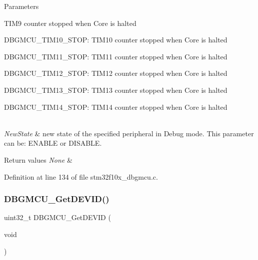 \begin{DoxyParams}{Parameters}
\begin{DoxyItemize}
T\+I\+M9 counter stopped when Core is halted \item D\+B\+G\+M\+C\+U\+\_\+\+T\+I\+M10\+\_\+\+S\+T\+OP\+: T\+I\+M10 counter stopped when Core is halted \item D\+B\+G\+M\+C\+U\+\_\+\+T\+I\+M11\+\_\+\+S\+T\+OP\+: T\+I\+M11 counter stopped when Core is halted \item D\+B\+G\+M\+C\+U\+\_\+\+T\+I\+M12\+\_\+\+S\+T\+OP\+: T\+I\+M12 counter stopped when Core is halted \item D\+B\+G\+M\+C\+U\+\_\+\+T\+I\+M13\+\_\+\+S\+T\+OP\+: T\+I\+M13 counter stopped when Core is halted \item D\+B\+G\+M\+C\+U\+\_\+\+T\+I\+M14\+\_\+\+S\+T\+OP\+: T\+I\+M14 counter stopped when Core is halted \end{DoxyItemize}
\\
\hline
{\em New\+State} & new state of the specified peripheral in Debug mode. This parameter can be\+: E\+N\+A\+B\+LE or D\+I\+S\+A\+B\+LE. \\
\hline
\end{DoxyParams}

\begin{DoxyRetVals}{Return values}
{\em None} & \\
\hline
\end{DoxyRetVals}


Definition at line 134 of file stm32f10x\+\_\+dbgmcu.\+c.

\mbox{\label{group___d_b_g_m_c_u___private___functions_gac34193c34dbce759bf424957a31b3266}} 
\subsubsection{\texorpdfstring{D\+B\+G\+M\+C\+U\+\_\+\+Get\+D\+E\+V\+I\+D()}{DBGMCU\_GetDEVID()}}
{\footnotesize\ttfamily uint32\+\_\+t D\+B\+G\+M\+C\+U\+\_\+\+Get\+D\+E\+V\+ID (\begin{DoxyParamCaption}\item[{void}]{ }\end{DoxyParamCaption})}



